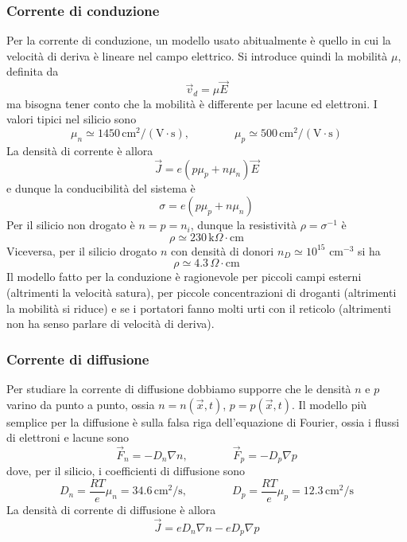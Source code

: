 \documentclass[a4paper, 11pt]{article}
\begin{document}
	\subsubsection{Corrente di conduzione}
	Per la corrente di conduzione, un modello usato abitualmente è quello in cui la velocità di deriva è lineare nel campo elettrico. Si introduce quindi la mobilità $\mu$, definita da
	\[\vec{v}_d=\mu\vec{E}\]
	ma bisogna tener conto che la mobilità è differente per lacune ed elettroni. I valori tipici nel silicio sono
	\[\mu_n\simeq1450\,\mathrm{cm}^2/(\mathrm{V}\cdot\mathrm{s}),\qquad\qquad\mu_p\simeq500\,\mathrm{cm}^2/(\mathrm{V}\cdot\mathrm{s})\]
	La densità di corrente è allora
	\[\vec{J}=e(p\mu_p+n\mu_n)\vec{E}\]
	e dunque la conducibilità del sistema è
	\[\sigma=e(p\mu_p+n\mu_n)\]
	Per il silicio non drogato è $n=p=n_i$, dunque la resistività $\rho=\sigma^{-1}$ è
	\[\rho\simeq230\,\mathrm{k}\Omega\cdot\mathrm{cm}\]
	Viceversa, per il silicio drogato $n$ con densità di donori $n_D\simeq10^{15}$ cm$^{-3}$ si ha
	\[\rho\simeq4.3\,\Omega\cdot\mathrm{cm}\]
	Il modello fatto per la conduzione è ragionevole per piccoli campi esterni (altrimenti la velocità satura), per piccole concentrazioni di droganti (altrimenti la mobilità si riduce) e se i portatori fanno molti urti con il reticolo (altrimenti non ha senso parlare di velocità di deriva).
	\subsubsection{Corrente di diffusione}
	Per studiare la corrente di diffusione dobbiamo supporre che le densità $n$ e $p$ varino da punto a punto, ossia $n=n(\vec{x},t)$, $p=p(\vec{x},t)$. Il modello più semplice per la diffusione è sulla falsa riga dell'equazione  di Fourier, ossia i flussi di elettroni e lacune sono
	\[\vec{F}_n=-D_n\nabla n,\qquad\qquad\vec{F}_p=-D_p\nabla p\]
	dove, per il silicio, i coefficienti di diffusione sono
	\[D_n=\frac{RT}{e}\mu_n=34.6\,\mathrm{cm}^2/\mathrm{s},\qquad\qquad D_p=\frac{RT}{e}\mu_p=12.3\,\mathrm{cm}^2/\mathrm{s}\]
	La densità di corrente di diffusione è allora
	\[\vec{J}=eD_n\nabla n-eD_p\nabla p\]
\end{document}
